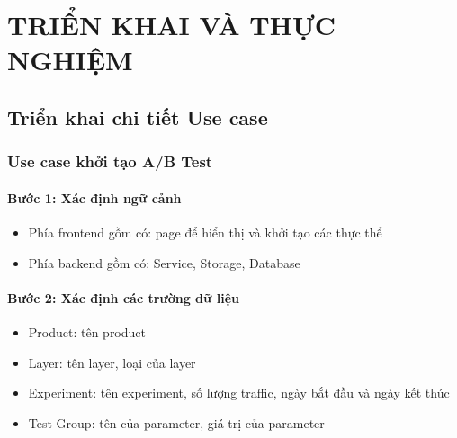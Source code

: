 \chapter{TRIỂN KHAI VÀ THỰC NGHIỆM}

%
%
%
%

\section{Triển khai chi tiết Use case}

\subsection{Use case khởi tạo A/B Test}

\subsubsection{Bước 1: Xác định ngữ cảnh}

\begin{itemize}
	\item Phía frontend gồm có: page để hiển thị và khởi tạo các thực thể
	\item Phía backend gồm có: Service, Storage, Database
\end{itemize}

\subsubsection{Bước 2: Xác định các trường dữ liệu}

\begin{itemize}
	\item Product: tên product
	\item Layer: tên layer, loại của layer
	\item Experiment: tên experiment, số lượng traffic, ngày bắt đầu và ngày kết thúc
	\item Test Group: tên của parameter, giá trị của parameter
\end{itemize}


